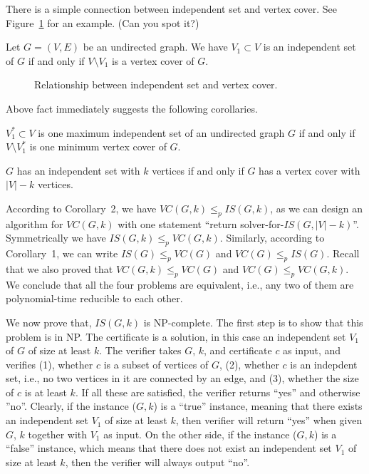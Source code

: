 There is a simple connection between independent set and vertex cover. 
See Figure~\ref{fig:is} for an example.
(Can you spot it?) 

\begin{fact}
Let $G = (V, E)$ be an undirected graph. We have $V_1\subset V$ is an independent set of $G$ if and only if $V\setminus V_1$ is a vertex cover of $G$.
\end{fact}

\begin{figure}[!h]
\centering{}
\caption{Relationship between independent set and vertex cover.}
\label{fig:is}
\end{figure}

Above fact immediately suggests the following corollaries.
\begin{corollary}
$V_1^*\subset V$ is one maximum independent set of an undirected graph $G$ if and only if $V\setminus V_1^*$ is one minimum vertex cover of $G$.
\end{corollary}
\begin{corollary}
$G$ has an independent set with $k$ vertices if and only if $G$ has a vertex cover with $|V|-k$ vertices.
\end{corollary}

According to Corollary~2, we have $VC(G, k) \le_p IS(G, k)$, as we can design
an algorithm for $VC(G,k)$ with one statement ``return
solver-for-$IS(G,|V|-k)$''.
Symmetrically we have $IS(G,k)\le_p VC(G,k)$.
Similarly, according to Corollary~1, we can write $IS(G) \le_p VC(G)$ and $VC(G) \le_p IS(G)$.
Recall that we also proved that $VC(G,k)\le_p VC(G)$ and $VC(G)\le_p VC(G,k)$. %
We conclude that all the four problems are equivalent, i.e., any two of them are polynomial-time reducible to each other.

We now prove that, $IS(G, k)$ is NP-complete.
The first step is to show that this problem is in NP.
The certificate is a solution, in this case an independent set $V_1$ of $G$ of size at least $k$.
The verifier takes $G$, $k$, and certificate $c$ as input, and verifies (1), whether $c$ is a subset of vertices of $G$,
(2), whether $c$ is an indepdent set, i.e., no two vertices in it are connected by an edge,
and (3), whether the size of $c$ is at least $k$. If all these are satisfied, the verifier returns ``yes'' and otherwise ''no''.
Clearly, if the instance ($G,k$) is a ``true'' instance, meaning that there exists an independent set $V_1$ of size at least $k$,
then verifier will return ``yes'' when given $G$, $k$ together with $V_1$ as input.
On the other side, if the instance ($G,k$) is a ``false'' instance, which means that there 
does not exist an independent set $V_1$ of size at least $k$, then the verifier will always output ``no''.

